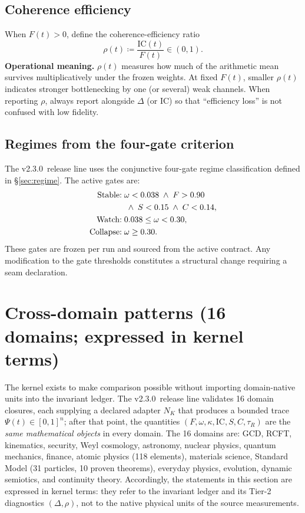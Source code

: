 \documentclass[
  aps,
  prd,
  preprint,
  superscriptaddress,
  nofootinbib,
  floatfix
]{revtex4-2}
\newcommand{\IC}{\mathrm{IC}}
\newcommand{\ValidatorLine}{v2.3.0}
\begin{document}
\subsection{Coherence efficiency}
When $F(t)>0$, define the coherence-efficiency ratio
\begin{equation}
  \rho(t) \coloneqq \frac{\IC(t)}{F(t)} \in (0,1).
\end{equation}
\noindent\textbf{Operational meaning.}
$\rho(t)$ measures how much of the arithmetic mean survives multiplicatively under the frozen weights.
At fixed $F(t)$, smaller $\rho(t)$ indicates stronger bottlenecking by one (or several) weak channels.
When reporting $\rho$, always report alongside $\Delta$ (or $\IC$) so that ``efficiency loss'' is not confused with low fidelity.

\subsection{Regimes from the four-gate criterion}
The \ValidatorLine\ release line uses the conjunctive four-gate regime classification defined in \S\ref{sec:regime}.
The active gates are:
\begin{align}
\text{Stable:}\;& \omega<0.038 \;\wedge\; F>0.90 \notag\\
  &\;\wedge\; S<0.15 \;\wedge\; C<0.14, \notag\\
\text{Watch:}\;& 0.038\le\omega<0.30, \notag\\
\text{Collapse:}\;& \omega\ge0.30.
\end{align}
These gates are frozen per run and sourced from the active contract.
Any modification to the gate thresholds constitutes a structural change requiring a seam declaration.
\section{Cross-domain patterns (16 domains; expressed in kernel terms)}
\label{sec:cross_domain}

The kernel exists to make comparison possible without importing domain-native units into the invariant ledger.
The \ValidatorLine\ release line validates 16 domain closures, each supplying a declared adapter $N_K$ that produces
a bounded trace $\Psi(t)\in[0,1]^n$; after that point, the quantities $(F,\omega,\kappa,\IC,S,C,\tau_R)$ are the
\emph{same mathematical objects} in every domain.
The 16 domains are: GCD, RCFT, kinematics, security, Weyl cosmology, astronomy, nuclear physics, quantum mechanics,
finance, atomic physics (118 elements), materials science, Standard Model (31 particles, 10 proven theorems),
everyday physics, evolution, dynamic semiotics, and continuity theory.
Accordingly, the statements in this section are expressed in kernel terms: they refer to the invariant ledger and its
Tier-2 diagnostics $(\Delta,\rho)$, not to the native physical units of the source measurements.
\end{document}
